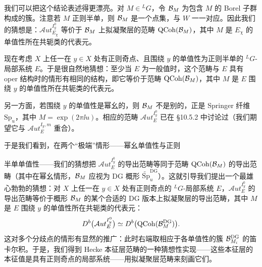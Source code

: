 
我们可以把这个结论表述得更漂亮。对 $M\in{}^L G$，令 $\mathcal{B}_M$ 为包含 $M$ 的 Borel 子群构成的簇。注意若 $M$ 正则半单，则 $\mathcal{B}_M$ 是一个点集，与 $W$ 一一对应。因此我们的猜想是：$\mathcal{A}ut^{I^0_y}_{E_\chi}$ 等价于 $\mathcal{B}_M$ 上拟凝聚层的范畴 $\operatorname{QCoh}(\mathcal{B}_M)$，其中 $M$ 是 $E_\chi$ 的单值性所在共轭类的代表元。

现在考虑 $X$ 上任一在 $y\in X$ 处有正则奇点、且围绕 $y$ 的单值性为正则半单的 ${}^L G$-局部系统 $E$。于是很自然地猜想：至少当 $E$ 为一般值时，这个范畴与 $E$ 具有 oper 结构时的情形有相同的结构，即它等价于范畴 $\operatorname{QCoh}(\mathcal{B}_M)$，其中 $M$ 是 $E$ 围绕 $y$ 的单值性所在共轭类的代表元。

另一方面，若围绕 $y$ 的单值性是幂幺的，则 $\mathcal{B}_M$ 不是别的，正是 Springer 纤维 $\mathrm{Sp}_u$，其中 $M=\exp(2\pi\ii u)$。相应的范畴 $\mathcal{A}ut^{I^0_y}_E$ 已在 §10.5.2 中讨论过（我们期望它与 $\mathcal{A}ut^{I_y,m}_E$ 重合）。

于是我们看到，在两个“极端”情形——幂幺单值性与正则

半单单值性——我们的猜想把 $\mathcal{A}ut^{I^0_y}_E$ 的导出范畴等同于范畴 $\operatorname{QCoh}(\mathcal{B}_M)$ 的导出范畴（其中在幂幺情形，$\mathcal{B}_M$ 应视为 DG 概形 $\widetilde{\mathrm{Sp}}^{\mathrm{DG}}_u$）。这就引导我们提出一个最雄心勃勃的猜想：对 $X$ 上任一在 $y\in X$ 处有正则奇点的 ${}^L G$-局部系统 $E$，$\mathcal{A}ut^{I^0_y}_E$ 的导出范畴等价于概形 $\mathcal{B}_M$ 的某个合适的 DG 版本上拟凝聚层的导出范畴，其中 $M$ 是 $E$ 围绕 $y$ 的单值性所在共轭类的代表元：
\[
    D^b\bigl(\mathcal{A}ut^{I^0_y}_E\bigr)
    \simeq D^b\bigl(\operatorname{QCoh}(\mathcal{B}^{\mathrm{DG}}_M)\bigr).
\]
这对多个分歧点的情形有显然的推广：此时右端取相应于各单值性的簇 $\mathcal{B}^{\mathrm{DG}}_{M_i}$ 的笛卡尔积。于是，我们得到 Hecke 本征层范畴的一种猜想性实现——这些本征层的本征值是具有正则奇点的局部系统——用拟凝聚层范畴来刻画它们。

